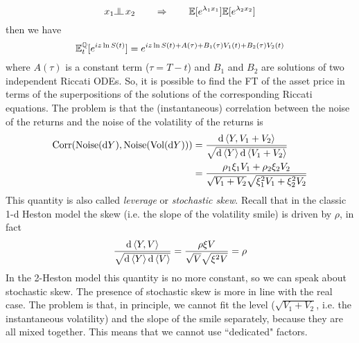 \begin{equation*}
    x_1 \indep\, x_2 \qquad\Rightarrow\qquad \mathbb{E}[e^{\lambda_1x_1}]\mathbb{E}[e^{\lambda_2x_2}]
\end{equation*}
then we have
\begin{equation}
    \mathbb{E}^{\mathbb{Q}}_t[e^{iz\ln S(t)}] = e^{iz\ln S(t) + A(\tau) + B_1(\tau)V_1(t) + B_2(\tau)V_2(t)}
\end{equation}
where $A(\tau)$ is a constant term ($\tau = T-t$) and $B_1$ and $B_2$ are solutions of two independent Riccati ODEs. So, it is possible to find the FT of the asset price in terms of the superpositions of the solutions of the corresponding Riccati equations. The problem is that the (instantaneous) correlation between the noise of the returns and the noise of the volatility of the returns is
\begin{align}
    \notag\text{Corr}(\text{Noise}(\dd Y), \text{Noise}(\text{Vol}(\dd Y))) &= \frac{\dd\expval{Y,V_1+V_2}}{\sqrt{\dd\expval{Y}\dd\expval{V_1+V_2}}} \\
    &=
    \frac{\rho_1\xi_1V_1+\rho_2\xi_2V_2}{\sqrt{V_1+V_2}\sqrt{\xi_1^2V_1 + \xi_2^2V_2}}
\end{align}
This quantity is also called \emph{leverage} or \emph{stochastic skew}. Recall that in the classic 1-d Heston model the skew (i.e. the slope of the volatility smile) is driven by $\rho$, in fact
\begin{equation*}
    \frac{\dd\expval{Y,V}}{\sqrt{\dd\expval{Y}\dd\expval{V}}} = \frac{\rho\xi V}{\sqrt{V}\sqrt{\xi^2 V}} = \rho
\end{equation*}
In the 2-Heston model this quantity is no more constant, so we can speak about stochastic skew. The presence of stochastic skew is more in line with the real case. The problem is that, in principle, we cannot fit the level ($\sqrt{V_1+V_2}$, i.e. the instantaneous volatility) and the slope of the smile separately, because they are all mixed together. This means that we cannot use ``dedicated" factors.
